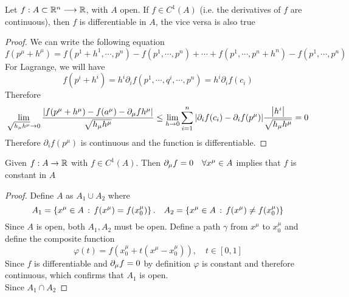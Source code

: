 \documentclass[../complete.tex]{subfiles}
\begin{document}
\begin{thm}
	Let $f:A\subset\mathbb{R}^n\overset{}{\longrightarrow}\mathbb{R}$, with $A$ open. If $f\in C^1(A)$ (i.e. the derivatives of $f$ are continuous), then $f$ is differentiable in $A$, the vice versa is also true
\end{thm}
\begin{proof}
	We can write the following equation
	\begin{equation}
		f(p^\mu+h^\mu)=f(p^1+h^1,\cdots,p^n)-f(p^1,\cdots,p^n)+\cdots+f(p^1,\cdots,p^n+h^n)-f(p^1,\cdots,p^n)
		\label{eq:prepcontdiff}
	\end{equation}
	For Lagrange, we will have
	\begin{equation}
		f(p^i+h^i)=h^i\partial_i{f}(p^1,\cdots,q^i,\cdots,p^n)=h^i\partial_if(c_i)
		\label{eq:lagrange}
	\end{equation}
	Therefore
	\begin{equation}
		\lim_{\sqrt{h_\mu h^\mu}\to0}\frac{\abs{f(p^\mu+h^\mu)-f(a^\mu)-\partial_\mu fh^\mu}}{\sqrt{h_\mu h^\mu}}\le\lim_{h\to0}\sum_{i=1}^n\abs{\partial_if(c_i)-\partial_if(p^\mu)}\frac{\abs{h^i}}{\sqrt{h_\mu h^\mu}}=0
		\label{eq:continuousdiff}
	\end{equation}
	Therefore $\partial_i f(p^\mu)$ is continuous and the function is differentiable.
\end{proof}
\begin{thm}
	Given $f:A\to\mathbb{R}$ with $f\in C^1(A)$. Then $\partial_\mu f=0\quad\forall x^\mu\in A$ implies that $f$ is constant in $A$
\end{thm}
\begin{proof}
	Define $A$ as $A_1\cup A_2$ where
	\begin{equation*}
		A_1=\left\{ x^\mu\in A\, :\,  f(x^\mu)=f(x^\mu_0) \right\}.\quad A_2=\left\{ x^\mu\in A\, :\,  f(x^\mu)\ne f(x^\mu_0) \right\}
	\end{equation*}
	Since $A$ is open, both $A_1,A_2$ must be open. Define a path $\gamma$ from $x^\mu$ to $x^\mu_0$ and define the composite function
	\begin{equation*}
		\varphi(t)=f\left( x^\mu_0+t(x^\mu-x^\mu_0) \right),\quad t\in[0,1]
	\end{equation*}
	Since $f$ is differentiable and $\partial_\mu f=0$ by definition $\varphi$ is constant and therefore continuous, which confirms that $A_1$ is open.\\
	Since $A_1\cap A_2$
\end{proof}
\end{document}
